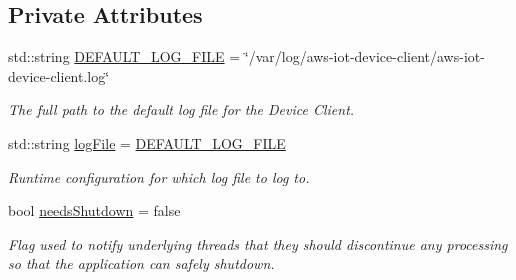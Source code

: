 \subsection*{Private Attributes}
\begin{DoxyCompactItemize}
\item 
std\+::string \hyperlink{class_aws_1_1_iot_1_1_device_client_1_1_logging_1_1_file_logger_a771b31b2f05b4f8fa29de755f15eb35c}{D\+E\+F\+A\+U\+L\+T\+\_\+\+L\+O\+G\+\_\+\+F\+I\+LE} = \char`\"{}/var/log/aws-\/iot-\/device-\/client/aws-\/iot-\/device-\/client.\+log\char`\"{}
\begin{DoxyCompactList}\small\item\em The full path to the default log file for the Device Client. \end{DoxyCompactList}\item 
\mbox{\label{class_aws_1_1_iot_1_1_device_client_1_1_logging_1_1_file_logger_abb78588623916c835dbca8751995f8cd}} 
std\+::string \hyperlink{class_aws_1_1_iot_1_1_device_client_1_1_logging_1_1_file_logger_abb78588623916c835dbca8751995f8cd}{log\+File} = \hyperlink{class_aws_1_1_iot_1_1_device_client_1_1_logging_1_1_file_logger_a771b31b2f05b4f8fa29de755f15eb35c}{D\+E\+F\+A\+U\+L\+T\+\_\+\+L\+O\+G\+\_\+\+F\+I\+LE}
\begin{DoxyCompactList}\small\item\em Runtime configuration for which log file to log to. \end{DoxyCompactList}\item 
\mbox{\label{class_aws_1_1_iot_1_1_device_client_1_1_logging_1_1_file_logger_a0e7a54d7e865f03ba082821248e4beef}} 
bool \hyperlink{class_aws_1_1_iot_1_1_device_client_1_1_logging_1_1_file_logger_a0e7a54d7e865f03ba082821248e4beef}{needs\+Shutdown} = false
\begin{DoxyCompactList}\small\item\em Flag used to notify underlying threads that they should discontinue any processing so that the application can safely shutdown. \end{DoxyCompactList}\item 
\mbox{\label{class_aws_1_1_iot_1_1_device_client_1_1_logging_1_1_file_logger_aae7badd8eb227b7207210e817c111188}} 

\end{DoxyCompactItemize}
